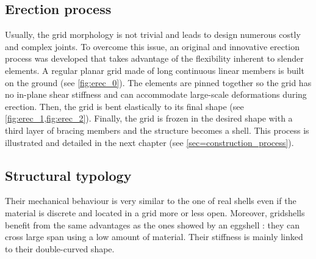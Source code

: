 \subsection{Erection process}\label{sec=def_erec}
Usually, the grid morphology is not trivial and leads to design numerous costly and complex joints. To overcome this issue, an original and innovative erection process was developed that takes advantage of the flexibility inherent to slender elements. A regular planar grid made of long continuous linear members is built on the ground (see \cref{fig:erec_0}). The elements are pinned together so the grid has no in-plane shear stiffness and can accommodate large-scale deformations during erection. Then, the grid is bent elastically to its final shape (see \cref{fig:erec_1,fig:erec_2}). Finally, the grid is frozen in the desired shape with a third layer of bracing members and the structure becomes a shell. This process is illustrated and detailed in the next chapter (see \cref{sec=construction_process}).




\subsection{Structural typology}\label{sec=def_topo}
Their mechanical behaviour is very similar to the one of real shells even if the material is discrete and located in a grid more or less open. Moreover, gridshells benefit from the same advantages as the ones showed by an eggshell : they can cross large span using a low amount of material. Their stiffness is mainly linked to their double-curved shape.

